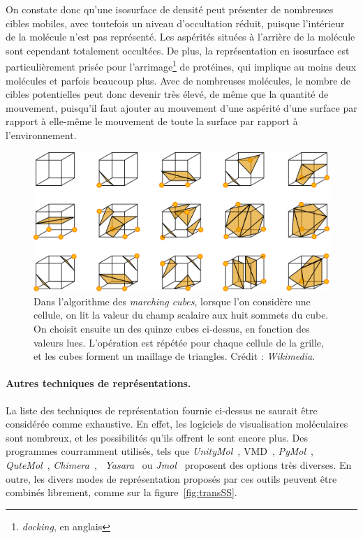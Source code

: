 	On constate donc qu'une isosurface de densité peut présenter de nombreuses cibles mobiles, avec toutefois un niveau d'occultation réduit, puisque l'intérieur de la molécule n'est pas représenté. Les aspérités situées à \og l'arrière \fg{} de la molécule sont cependant totalement occultées. De plus, la représentation en isosurface est particulièrement prisée pour l'arrimage\footnote{\emph{docking}, en anglais} de protéines, qui implique au moins deux molécules et parfois beaucoup plus. Avec de nombreuses molécules, le nombre de cibles potentielles peut donc devenir très élevé, de même que la quantité de mouvement, puisqu'il faut ajouter au mouvement d'une aspérité d'une surface par rapport à elle-même le mouvement de toute la surface par rapport à l'environnement.
	
	\begin{figure}[H]
		\centering
		\includegraphics[width=\textwidth]{figures/ch1/marchingCubes}
		\caption{Dans l'algorithme des \emph{marching cubes}, lorsque l'on considère une cellule, on lit la valeur du champ scalaire aux huit sommets du cube. On choisit ensuite un des quinze cubes ci-dessus, en fonction des valeurs lues. L'opération est répétée pour chaque cellule de la grille, et les cubes forment un maillage de triangles. Crédit : \emph{Wikimedia}.}
		\label{fig:marchingCubes}
	\end{figure}
	
	\paragraph{Autres techniques de représentations.}
	La liste des techniques de représentation fournie ci-dessus ne saurait être considérée comme exhaustive. En effet, les logiciels de visualisation moléculaires sont nombreux, et les possibilités qu'ils offrent le sont encore plus. Des programmes courramment utilisés, tels que \emph{UnityMol}~\cite{doutreligne2014unitymol}, VMD~\cite{humphrey1996vmd}, \emph{PyMol}~\cite{delano2002pymol}, \emph{QuteMol}~\cite{tarini2006ambient, tarini2006qutemol}, \emph{Chimera}~\cite{pettersen2004ucsf}, ~\emph{Yasara}~\cite{krieger2014yasara} ou \emph{Jmol}~\cite{herraez2006biomolecules} proposent des options très diverses. En outre, les divers modes de représentation proposés par ces outils peuvent être combinés librement, comme sur la figure~\ref{fig:transSS}.
	
